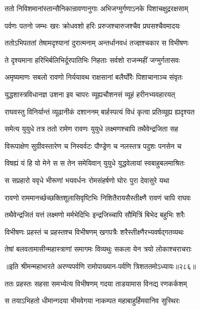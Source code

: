 

\twolineshloka
{ततो निविशमानांस्तान्सैनिकान्रावणानुगाः}
{अभिजग्मुर्गणाऽनके पिशाचक्षुद्ररक्षसाम्}


\twolineshloka
{पर्वणः पतनो जम्भः खरः क्रोधवशो हरिः}
{प्ररुजश्चारुजश्चैव प्रघसश्चैवमादयः}


\twolineshloka
{ततोऽभिपततां तेषामदृश्यानां दुरात्मनाम्}
{अन्तर्धानवधं तज्ज्ञश्चकार स विभीषणः}


\twolineshloka
{ते दृश्यमाना हरिभिर्बलिभिर्दूरपातिभिः}
{निहताः सर्वशो राजन्महीं जग्मुर्गतासवः}


\twolineshloka
{अमृष्यमाणः सबलो रावणो निर्ययावथ}
{राक्षसानां बलैर्घोरैः पिशाचानाञ्च संवृतः}


\twolineshloka
{युद्धशास्त्रविधानज्ञ उशना इव चापरः}
{व्यूह्यचौशनसं व्यूहं हरीनभ्यवहारयत्}


\twolineshloka
{राघवस्तु विनिर्यान्तं व्यूढानीकं दशाननम्}
{बार्हस्पत्यं विधं कृत्वा प्रतिव्यूह्य ह्यदृश्यत}


\twolineshloka
{समेत्य युयुधे तत्र ततो रामेण रावणः}
{युयुधे लक्ष्मणश्चापि तथैवेन्द्रजिता सह}


\twolineshloka
{विरूपाक्षेण सुग्रीवस्तारेण च निस्वर्वटः}
{पौण्ड्रेण च नलस्तत्र पदुशः पनसेन च}


\twolineshloka
{विषह्यं यं हि यो मेने स स तेन समेयिवान्}
{युयुधे युद्धवेलायां स्वबाहुबलमाश्रितः}


\twolineshloka
{स सप्रहारो ववृधे भीरूणां भयवर्धनः}
{रोमसंहर्षणो घोरः पुरा देवासुरे यथा}


\twolineshloka
{रावणो राममानर्च्छच्छक्तिशूलासिवृष्टिभिः}
{निशितैरायसैस्तीक्ष्णै रावणं चापि राघवः}


\twolineshloka
{तथैवेन्द्रजितं यत्तं लक्ष्मणो मर्मभेदिभिः}
{इन्द्रजिच्चापि सौमित्रिं बिभेद बहुभिः शरैः}


\twolineshloka
{विभीषणः प्रहस्तं च प्रहस्तश्च विभीषणम्}
{खगपत्रैः शरैस्तीक्ष्णैरभ्यवर्षद्गतव्यथः}


\twolineshloka
{तेषां बलवतामासीन्महास्त्राणां समागमः}
{विव्यथुः सकला येन त्रयो लोकाश्चराचराः}


॥इति श्रीमन्महाभारते अरण्यपर्वणि रामोपाख्यान-पर्वणि त्रिशततमोऽध्यायः॥२८६॥




\twolineshloka
{ततः प्रहस्तः सहसा समभ्येत्य विभीषणम्}
{गदया ताडयामास विनद्य रणकर्कशम्}


\twolineshloka
{स तयाऽभिहतो धीमान्गदया भीमवेगया}
{नाकम्पत महाबाहुर्हिमवानिव सुस्थिरः}


